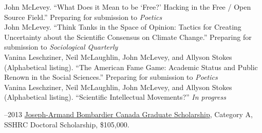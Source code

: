 \documentclass[11pt,usenames,dvipsnames]{article}
\begin{document}



\ind John McLevey. ``What Does it Mean to be `Free?' Hacking in the Free / Open Source Field.'' Preparing for submission to \emph{Poetics} \\

\ind John McLevey. ``Think Tanks in the Space of Opinion: Tactics for Creating Uncertainty about the Scientific Consensus on Climate Change.''  Preparing for submission to \emph{Sociological Quarterly} \\

\ind Vanina Leschziner, Neil McLaughlin, John McLevey, and Allyson Stokes (Alphabetical listing). ``The American Fame Game: Academic Status and Public Renown in the Social Sciences.'' Preparing for submission to \emph{Poetics} \\

\ind Vanina Leschziner, Neil McLaughlin, John McLevey, and Allyson Stokes (Alphabetical listing). ``Scientific Intellectual Movements?'' \emph{In progress} \\ %





–2013 \href{http://www.sshrc-crsh.gc.ca/funding-financement/programs-programmes/fellowships/doctoral-doctorat-eng.aspx}{Joseph-Armand Bombardier Canada Graduate Scholarship}, Category A, SSHRC Doctoral Scholarship, \$105,000.\\
\end{document}
